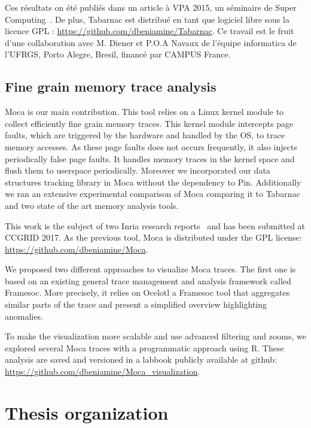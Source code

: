 Ces résultats on été publiés dans un article à \gls{VPA} 2015, un séminaire de Super Computing~\cite{Beniamine15TABARNAC}.
De plus, \gls{Tabarnac} est distribué en tant que logiciel libre sous la licence \gls{GPL} : \url{https://github.com/dbeniamine/Tabarnac}.
Ce travail est le fruit d'une collaboration avec M. Diener et P.O.A Navaux de l'équipe informatica de l'\gls{UFRGS}, Porto Alegre, Bresil, financé par CAMPUS France.

\subsection*{Fine grain memory trace analysis}

\gls{Moca} is our main contribution.
This tool relies on a \gls{Linux} kernel module to collect efficiently fine grain memory traces.
This kernel module intercepts page faults, which are triggered by the hardware and handled by the \gls{OS}, to trace memory accesses.
As these page faults does not occurs frequently, it also injects periodically false page faults.
It handles memory traces in the kernel space and flush them to userspace periodically.
Moreover we incorporated our data structures tracking library in \gls{Moca} without the dependency to \gls{Pin}.
Additionally we ran an extensive experimental comparison of \gls{Moca} comparing it to \gls{Tabarnac} and two state of the art memory analysis tools.

This work is the subject of two Inria research reports~\cite{Beniamine15Memory,Beniamine16Moca} and has been submitted at \gls{CCGRID} 2017.
As the previous tool, \gls{Moca} is distributed under the \gls{GPL} license:\\
\url{https://github.com/dbeniamine/Moca}.

We proposed two different approaches to visualize \gls{Moca} traces.
The first one is based on an existing general trace management and analysis framework called \gls{Framesoc}.
More precisely, it relies on \gls{Ocelotl} a \gls{Framesoc} tool that aggregates similar parts of the trace and present a simplified overview highlighting anomalies.

To make the visualization more scalable and use advanced filtering and zooms, we explored several \gls{Moca} traces with a programmatic approach using \gls{R}.
These analysis are saved and versioned in a labbook publicly available at github: \url{https://github.com/dbeniamine/Moca_visualization}.

\section*{Thesis organization}


